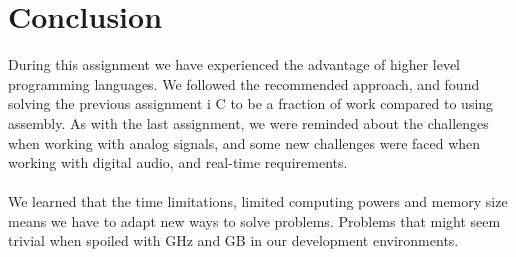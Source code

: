 \newpage
\section{Conclusion}
During this assignment we have experienced the advantage of higher level programming languages.
We followed the recommended approach, and found solving the previous assignment i C to be a fraction
of work compared to using assembly. As with the last assignment, we were reminded about the challenges
when working with analog signals, and some new challenges were faced when working with digital audio,
and real-time requirements.\\
\\
We learned that the time limitations, limited computing powers and memory size means we have to adapt new ways to
solve problems. Problems that might seem trivial when spoiled with GHz and GB in our development environments.
